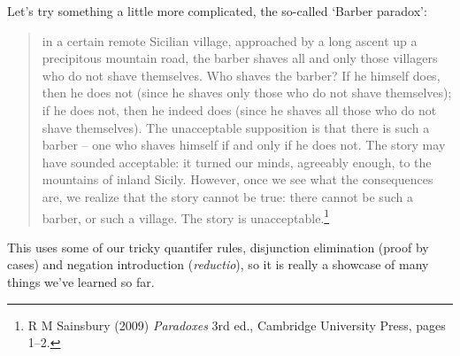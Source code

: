 Let's try something a little more complicated, the so-called `Barber paradox': \begin{quote}
	 in a certain remote Sicilian village, approached by a long ascent up a precipitous mountain road, the barber shaves all and only those villagers who do not shave themselves. Who shaves the barber? If he himself does, then he does not (since he shaves only those who do not shave themselves); if he does not, then he indeed does (since he shaves all those who do not shave themselves).  The unacceptable supposition is that there is such a barber – one who shaves himself if and only if he does not. The story may have sounded acceptable: it turned our minds, agreeably enough, to the mountains of inland Sicily. However, once we see what the consequences are, we realize that the story cannot be true: there cannot be such a barber, or such a village. The story is unacceptable.\footnote{R M Sainsbury (2009) \emph{Paradoxes} 3rd ed., Cambridge University Press, pages 1–2.}
\end{quote} This uses some of our tricky quantifer rules, disjunction elimination (proof by cases) and negation introduction (\emph{reductio}), so it is really a showcase of many things we've learned so far. 

